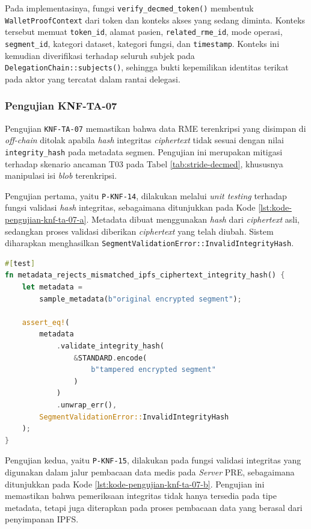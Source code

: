 \documentclass[bahasa, 12pt, a4paper, onecolumn, oneside, final]{report}
\begin{document}
Pada implementasinya, fungsi \texttt{verify\_decmed\_token()} membentuk \texttt{WalletProofContext} dari token dan konteks akses yang sedang diminta. Konteks tersebut memuat \texttt{token\_id}, alamat pasien, \texttt{related\_rme\_id}, mode operasi, \texttt{segment\_id}, kategori dataset, kategori fungsi, dan \texttt{timestamp}. Konteks ini kemudian diverifikasi terhadap seluruh subjek pada \texttt{DelegationChain::subjects()}, sehingga bukti kepemilikan identitas terikat pada aktor yang tercatat dalam rantai delegasi.

\subsubsection{Pengujian KNF-TA-07}
\label{subsubsec:pengujian-knf-ta-07}

Pengujian \texttt{KNF-TA-07} memastikan bahwa data RME terenkripsi yang disimpan di \textit{off-chain} ditolak apabila \textit{hash} integritas \textit{ciphertext} tidak sesuai dengan nilai \texttt{integrity\_hash} pada metadata segmen. Pengujian ini merupakan mitigasi terhadap skenario ancaman T03 pada Tabel \ref{tab:stride-decmed}, khususnya manipulasi isi \textit{blob} terenkripsi.

Pengujian pertama, yaitu \texttt{P-KNF-14}, dilakukan melalui \textit{unit testing} terhadap fungsi validasi \textit{hash} integritas, sebagaimana ditunjukkan pada Kode \ref{lst:kode-pengujian-knf-ta-07-a}. Metadata dibuat menggunakan \textit{hash} dari \textit{ciphertext} asli, sedangkan proses validasi diberikan \textit{ciphertext} yang telah diubah. Sistem diharapkan menghasilkan \texttt{SegmentValidationError::InvalidIntegrityHash}.

\begin{lstlisting}[language=Rust, caption=Pengujian P-KNF-14 untuk KNF-TA-07, label=lst:kode-pengujian-knf-ta-07-a]
#[test]
fn metadata_rejects_mismatched_ipfs_ciphertext_integrity_hash() {
    let metadata =
        sample_metadata(b"original encrypted segment");

    assert_eq!(
        metadata
            .validate_integrity_hash(
                &STANDARD.encode(
                    b"tampered encrypted segment"
                )
            )
            .unwrap_err(),
        SegmentValidationError::InvalidIntegrityHash
    );
}
\end{lstlisting}

Pengujian kedua, yaitu \texttt{P-KNF-15}, dilakukan pada fungsi validasi integritas yang digunakan dalam jalur pembacaan data medis pada \textit{Server} PRE, sebagaimana ditunjukkan pada Kode \ref{lst:kode-pengujian-knf-ta-07-b}. Pengujian ini memastikan bahwa pemeriksaan integritas tidak hanya tersedia pada tipe metadata, tetapi juga diterapkan pada proses pembacaan data yang berasal dari penyimpanan IPFS.
\end{document}
